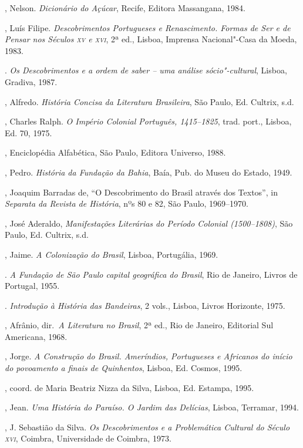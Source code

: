 \begin{bibliohedra}
, Nelson. \textit{Dicionário do Açúcar}, Recife, Editora
Massangana, 1984.

, Luís Filipe. \textit{Descobrimentos Portugueses e
Renascimento. Formas de Ser e de Pensar nos Séculos \textsc{xv} e \textsc{xvi}}, 2ª ed.,
Lisboa, Imprensa Nacional"-Casa da Moeda, 1983.

\titidem. \textit{Os Descobrimentos e a ordem de saber --
uma análise sócio"-cultural}, Lisboa, Gradiva, 1987.

, Alfredo. \textit{História Concisa da Literatura Brasileira}, São
Paulo, Ed. Cultrix, s.d.

, Charles Ralph. \textit{O Império Colonial Português, 1415--1825}, 
trad. port., Lisboa, Ed. 70, 1975.

, Enciclopédia Alfabética, São
Paulo, Editora Universo, 1988.

, Pedro. \textit{História da Fundação da Bahia}, Baía, Pub. do
Museu do Estado, 1949.

, Joaquim Barradas de, ``O Descobrimento do Brasil através dos
Textos'', in \textit{Separata da Revista de História}, nºs 80 e 82, São
Paulo, 1969--1970.

, José Aderaldo, \textit{Manifestações Literárias do Período
Colonial (1500--1808)}, São Paulo, Ed. Cultrix, s.d.

, Jaime. \textit{A Colonização do Brasil}, Lisboa, Portugália,
1969.

\titidem. \textit{A Fundação de São Paulo capital geográfica do
Brasil}, Rio de Janeiro, Livros de Portugal, 1955.

\titidem. \textit{Introdução à História das Bandeiras}, 2
vols., Lisboa, Livros Horizonte, 1975.

, Afrânio, dir.~\textit{A Literatura no Brasil}, 2ª ed., Rio
de Janeiro, Editorial Sul Americana, 1968.

, Jorge. \textit{A Construção do Brasil. Ameríndios, Portugueses
e Africanos do início do povoamento a finais de Quinhentos}, Lisboa,
Ed. Cosmos, 1995.

, coord. de Maria
Beatriz Nizza da Silva, Lisboa, Ed. Estampa, 1995.

, Jean. \textit{Uma História do Paraíso. O Jardim das
Delícias}, Lisboa, Terramar, 1994.

, J. Sebastião da Silva. \textit{Os Descobrimentos e a
Problemática Cultural do Século \textsc{xvi}}, Coimbra, Universidade de Coimbra, 1973.


\end{bibliohedra}
